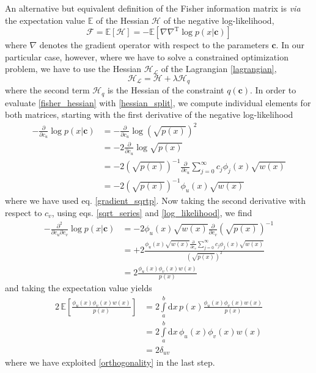\documentclass[]{report}
\begin{document}
		An alternative but equivalent definition of the Fisher information matrix is \textit{via} the expectation value $\mathbb{E}$ of the Hessian $\bm{\mathcal{H}}$ of the negative log-likelihood,
		\begin{equation}\label{fisher_hessian}
			\bm{\mathcal{F}} = \mathbb{E}\left[\bm{\mathcal{H}}\right] = -\mathbb{E}\left[\nabla\nabla^\mathrm{T}\log p(x\vert\mathbf{c})\right]
		\end{equation}
		where $\nabla$ denotes the gradient operator with respect to the parameters $\mathbf{c}$. In our particular case, however, where we have to solve a constrained optimization problem, we have to use the Hessian $\bm{\mathcal{H}}_\mathcal{L}$ of the Lagrangian \ref{lagrangian},
		\begin{equation}\label{hessian_split}
			\bm{\mathcal{H}}_\mathcal{L} = \bm{\mathcal{H}} + \lambda\bm{\mathcal{H}}_q
		\end{equation}
		where the second term $\bm{\mathcal{H}}_q$ is the Hessian of the constraint $q(\mathbf{c})$. In order to evaluate \ref{fisher_hessian} with \ref{hessian_split}, we compute individual elements for both matrices, starting with the first derivative of the negative log-likelihood
		\begin{align}\label{gradient_logp}
			-\frac{\partial}{\partial c_u}\log p(x\vert\mathbf{c}) & = -\frac{\partial}{\partial 	c_u}\log\left(\sqrt{p(x)}\right)^2 \nonumber \\
			& = -2\frac{\partial}{\partial c_u}\log\sqrt{p(x)} \\
			& = -2\left(\sqrt{p(x)}\right)^{-1}\frac{\partial}{\partial c_u}\sum_{j=0}^{\infty}c_j\phi_j(x)\sqrt{w(x)} \nonumber \\
			& = -2\left(\sqrt{p(x)}\right)^{-1}\phi_u(x)\sqrt{w(x)} \nonumber
		\end{align}
		where we have used eq. \ref{gradient_sqrtp}. Now taking the second derivative with respect to $c_v$, using eqs. \ref{sqrt_series} and \ref{log_likelihood}, we find
		\begin{align}\label{hessian_logp}
			-\frac{\partial^2}{\partial c_u\partial c_v}\log p(x\vert\mathbf{c}) & = -2\phi_u(x)\sqrt{w(x)}\frac{\partial}{\partial c_v}\left(\sqrt{p(x)}\right)^{-1} \nonumber \\
			& = +2\frac{\phi_u(x)\sqrt{w(x)}\frac{\partial}{\partial c_v}\sum_{j=0}^{\infty}c_j\phi_j(x)\sqrt{w(x)}}{\left(\sqrt{p(x)}\right)^{2}} \nonumber \\
			& = 2\frac{\phi_u(x)\phi_v(x)w(x)}{p(x)}
		\end{align}
		and taking the expectation value yields
		\begin{align}
			2\,\mathbb{E}\left[\frac{\phi_u(x)\phi_v(x)w(x)}{p(x)}\right] & = 	2\int\limits_a^b\mathrm{d}x\,p(x)\frac{\phi_u(x)\phi_v(x)w(x)}{p(x)} \nonumber \\
			& = 2\int\limits_a^b\mathrm{d}x\,\phi_u(x)\phi_v(x)w(x) \\
			& = 2\delta_{uv} \nonumber
		\end{align}
		where we have exploited \ref{orthogonality} in the last step.
		
\end{document}
